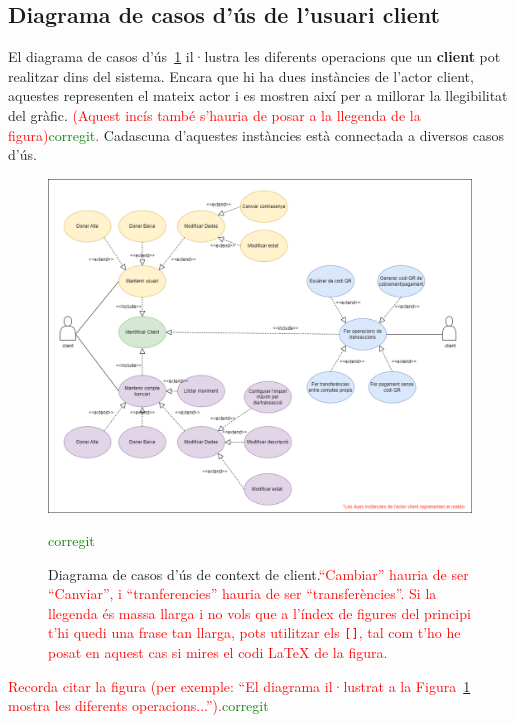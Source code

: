 \documentclass[a4paper,12pt,twoside]{ThesisStyle}
\newcommand{\pau}[1]{\textcolor{red}{#1}}
\newcommand{\sudan}[1]{\textcolor{green}{#1}}
\begin{document}
\subsection{Diagrama de casos d'ús de l'usuari client}
\label{subsec: Diagrama de casos d'ús de l'usuari client}

El diagrama de casos d'ús~\ref{fig:Diagrama de Casos d'Ús de Context de Client} il·lustra les diferents operacions que un \textbf{client} pot realitzar dins del sistema. Encara que hi ha dues instàncies de l'actor client, aquestes representen el mateix actor i es mostren així per a millorar la llegibilitat del gràfic. \pau{(Aquest incís també s'hauria de posar a la llegenda de la figura)\sudan{corregit}.} Cadascuna d'aquestes instàncies està connectada a diversos casos d'ús.


\begin{figure}[h]
    \centering
    \includegraphics[width=1\textwidth]{imatges/diagrama caso de uso client.png}
    \caption[Diagrama de casos d'ús de context de client.]{Diagrama de casos d'ús de context de client.\pau{``Cambiar'' hauria de ser ``Canviar'', i ``tranferencies'' hauria de ser ``transferències''.} \pau{Si la llegenda és massa llarga i no vols que a l'índex de figures del principi t'hi quedi una frase tan llarga, pots utilitzar els \texttt{[]}, tal com t'ho he posat en aquest cas si mires el codi LaTeX de la figura.}}\sudan{corregit}
    \label{fig:Diagrama de Casos d'Ús de Context de Client}
\end{figure}

\pau{Recorda citar la figura (per exemple: ``El diagrama il·lustrat a la Figura~\ref{fig:Diagrama de Casos d'Ús de Context de Client} mostra les diferents operacions...'').}\sudan{corregit}
\end{document}
